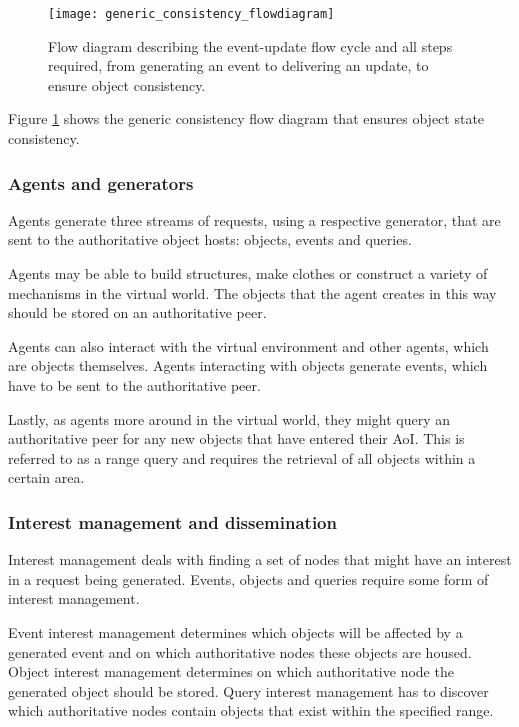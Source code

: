 \begin{figure}[htbp]
 \centering
 \texttt{[image: generic\_consistency\_flowdiagram]}
 \caption{Flow diagram describing the event-update flow cycle and all steps required, from generating an event to delivering an update, to ensure object consistency.}
 \label{fig_event_update_flowdiagram}
\end{figure}

Figure \ref{fig_event_update_flowdiagram} shows the generic consistency flow diagram that ensures object state consistency.

\subsubsection{Agents and generators}

Agents generate three streams of requests, using a respective generator, that are sent to the authoritative object hosts: objects, events and queries.

Agents may be able to build structures, make clothes or construct a variety of mechanisms in the virtual world. The objects that the agent creates in this way should be stored on an authoritative peer.

Agents can also interact with the virtual environment and other agents, which are objects themselves. Agents interacting with objects generate events, which have to be sent to the authoritative peer.

Lastly, as agents more around in the virtual world, they might query an authoritative peer for any new objects that have entered their AoI. This is referred to as a range query and requires the retrieval of all objects within a certain area.

\subsubsection{Interest management and dissemination}

Interest management deals with finding a set of nodes that might have an interest in a request being generated. Events, objects and queries require some form of interest management.

Event interest management determines which objects will be affected by a generated event and on which authoritative nodes these objects are housed. Object interest management determines on which authoritative node the generated object should be stored. Query interest management has to discover which authoritative nodes contain objects that exist within the specified range.

